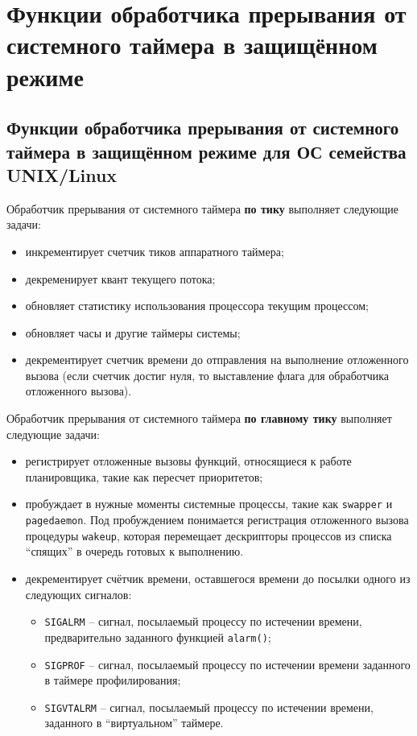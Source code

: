\chapter{Функции обработчика прерывания от системного таймера в защищённом режиме}

\section{Функции обработчика прерывания от системного таймера в защищённом режиме для ОС семейства UNIX/Linux}

Обработчик прерывания от системного таймера \textbf{по тику} выполняет следующие задачи:
\begin{itemize}
    \item инкрементирует счетчик тиков аппаратного таймера;
    \item декременирует квант текущего потока;
    \item обновляет статистику использования процессора текущим процессом;
    \item обновляет часы и другие таймеры системы;
    \item декрементирует счетчик времени до отправления на выполнение отложенного вызова (если счетчик достиг нуля, то выставление флага для обработчика отложенного вызова).
\end{itemize}

Обработчик прерывания от системного таймера \textbf{по главному тику} выполняет следующие задачи:
\begin{itemize}
    \item регистрирует отложенные вызовы функций, относящиеся к работе планировщика, такие как пересчет приоритетов;
    \item пробуждает в нужные моменты системные процессы, такие как \texttt{swapper} и \texttt{pagedaemon}.
        Под пробуждением понимается регистрация отложенного вызова процедуры \texttt{wakeup}, которая перемещает дескрипторы процессов из списка ``спящих'' в очередь готовых к выполнению.
    \item декрементирует счётчик времени, оставшегося времени до посылки одного из следующих сигналов:
        \begin{itemize}
            \item \texttt{SIGALRM} – сигнал, посылаемый процессу по истечении времени, предварительно заданного функцией \texttt{alarm()};
            \item \texttt{SIGPROF} –  сигнал, посылаемый процессу по истечении времени заданного в таймере профилирования;
            \item \texttt{SIGVTALRM} –  сигнал, посылаемый процессу по истечении времени, заданного в ``виртуальном'' таймере.
        \end{itemize}
\end{itemize}

